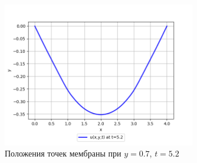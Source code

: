 {{\begin{figure}[H]
    \centering                             
	\includegraphics[width=0.75\textwidth,height=\textheight,keepaspectratio]{02_07_52.png}                 
	\caption{ Положения точек мембраны при $y=0.7$, $t=5.2$}
	\label{grapics2}                           
\end{figure}                                  

}}
